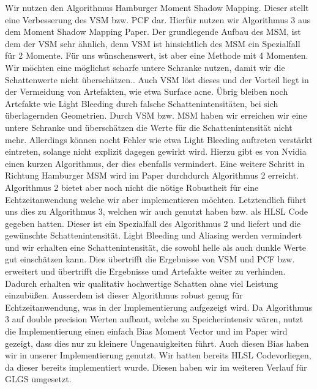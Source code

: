 \documentclass[runningheaders,a4paper]{llncs}
\begin{document}
Wir nutzen den Algorithmus Hamburger Moment Shadow Mapping. Dieser stellt eine Verbesserung des VSM bzw. PCF dar. Hierfür nutzen wir Algorithmus 3 aus dem Moment Shadow Mapping Paper.\cite{msm} Der grundlegende Aufbau des MSM, ist dem der VSM sehr ähnlich, denn VSM ist hinsichtlich des MSM ein Spezialfall für 2 Momente. Für uns wünschenswert, ist aber eine Methode mit 4 Momenten.
Wir möchten eine möglichst scharfe untere Schranke nutzen, damit wir die Schattenwerte nicht überschätzen.\cite{msm}. 
Auch VSM löst dieses und der Vorteil liegt in der Vermeidung von Artefakten, wie etwa Surface acne. Übrig bleiben noch Artefakte wie Light Bleeding durch falsche Schattenintensitäten, bei sich überlagernden Geometrien. Durch VSM bzw. MSM haben wir erreichen wir eine untere Schranke und überschätzen die Werte für die Schattenintensität nicht mehr. Allerdings können nocht Fehler wie etwa Light Bleeding auftreten verstärkt eintreten, solange nicht explizit dagegen gewirkt wird.
Hierzu gibt es von Nvidia einen kurzen Algorithmus, der dies ebenfalls vermindert.\cite{nvidiavsm}
Eine weitere Schritt in Richtung Hamburger MSM wird im Paper durchdurch Algorithmus 2 erreicht.
Algorithmus 2 bietet aber noch nicht die nötige Robustheit für eine Echtzeitanwendung welche wir aber implementieren möchten.\cite{msm}
Letztendlich führt uns dies zu Algorithmus 3, welchen wir auch genutzt haben bzw. als HLSL Code gegeben hatten. Dieser ist ein Spezialfall des Algorithmus 2 und liefert und  die gewünschte Schattenintensität. 
Light Bleeding und Aliasing werden vermindert und wir erhalten eine Schattenintensität, die sowohl helle als auch dunkle Werte gut einschätzen kann. 
Dies übertrifft die Ergebnisse von VSM und PCF bzw. erweitert und übertrifft die Ergebnisse umd Artefakte weiter zu verhinden. Dadurch erhalten wir qualitativ hochwertige Schatten ohne viel Leistung einzubüßen. Ausserdem ist dieser Algorithmus robust genug für Echtzeitanwendung, was in der Implementierung aufgezeigt wird. 
Da Algorithmus 3 auf double precision Werten aufbaut, welche zu Speicherintensiv wären, nutzt die Implementierung einen einfach Bias Moment Vector und im Paper wird gezeigt, dass dies nur zu kleinere Ungenauigkeiten führt.\cite{msm} Auch diesen Bias haben wir in unserer Implementierung genutzt. Wir hatten bereits HLSL Codevorliegen, da dieser bereits implementiert wurde. Diesen haben wir im weiteren Verlauf für GLGS umgesetzt.
\end{document}
